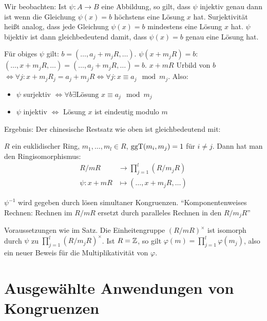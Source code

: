 \documentclass[a4paper,DIV15,BCOR12mm]{article}
\begin{document}
Wir beobachten: Ist $\psi: A\to B$ eine Abbildung, so gilt, dass
$\psi$ injektiv genau dann ist wenn die Gleichung $\psi(x) = b$
höchstens eine Lösung $x$ hat. Surjektivität heißt analog, dass jede
Gleichung $\psi(x) = b$ mindestens eine Lösung $x$ hat. $\psi$
bijektiv ist dann gleichbedeutend damit, dass $\psi(x) =b $ genau
eine Lösung hat.

Für obiges $\psi$ gilt: $b = (\ldots,a_j+ m_jR,\ldots)$.
$\psi(x+m_jR)=b$: $(\ldots,x+m_jR,\ldots) =(\ldots,a_j+m_jR,\ldots)
= b$. $x+mR$ Urbild von $b$ $\iff \forall j: x+m_jR_j = a_j+m_jR
\iff \forall j: x \equiv a_j \mod m_j$. Also:
\begin{itemize}
\item $\psi$ surjektiv $\iff \forall b \exists \text{Lösung } x\equiv a_j \mod m_j$
\item $\psi$ injektiv $\iff$ Lösung $x$ ist eindeutig modulo $m$
\end{itemize}
Ergebnis: Der chinesische Restsatz wie oben ist gleichbedeutend mit:

\begin{satz}
$R$ ein euklidischer Ring, $m_1,\ldots,m_l\in R$, $\mathop{\rm ggT}\nolimits(m_i,m_j)=1$
für $i\ne j$. Dann hat man den Ringisomorphismus:
\begin{align*}
R/mR &\to \prod_{j=1}^l (R/m_jR) \\
\psi: x + mR &\mapsto (\ldots, x + m_jR, \ldots )
\end{align*}
\end{satz}

\begin{bemerkung}
$\psi^{-1}$ wird gegeben durch lösen simultaner Kongruenzen.
"`Komponentenweises Rechnen: Rechnen im $R/mR$ ersetzt durch
paralleles Rechnen in den $R/m_jR$"'
\end{bemerkung}

\begin{bemerkung}
Voraussetzungen wie im Satz. Die Einheitengruppe $(R/mR)^\times$ ist
isomorph durch $\psi$ zu $\prod_{j=1}^l (R/m_jR)^\times $. Ist
$R=\mathbb{Z}$, so gilt $\varphi(m) = \prod_{j=1}^l \varphi(m_j)$, also
ein neuer Beweis für die Multiplikativität von $\varphi$.
\end{bemerkung}

\section{Ausgewählte Anwendungen von Kongruenzen}
\end{document}
